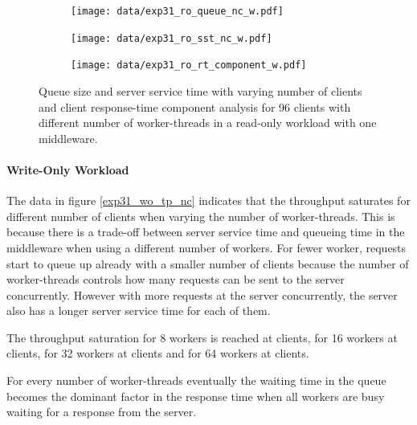 \documentclass[11pt,a4paper]{article}
\begin{document}


\begin{figure}
	\begin{subfigure}[b]{.33\linewidth}
		\centering
		\texttt{[image: data/exp31\_ro\_queue\_nc\_w.pdf]}
		\caption{}\label{exp31_ro_q}
	\end{subfigure}\hfill
	\begin{subfigure}[b]{.33\linewidth}
		\centering
		\texttt{[image: data/exp31\_ro\_sst\_nc\_w.pdf]}
		\caption{}\label{exp31_ro_sst}
	\end{subfigure}\hfill
	\begin{subfigure}[b]{.33\linewidth}
		\centering
		\texttt{[image: data/exp31\_ro\_rt\_component\_w.pdf]}
		\caption{}\label{exp31_ro_rtcomp}
	\end{subfigure}
	\caption{Queue size and server service time with varying number of clients and client response-time component analysis for 96 clients with different number of worker-threads in a read-only workload with one middleware.}
\end{figure}


\paragraph{Write-Only Workload}


The data in figure \ref{exp31_wo_tp_nc} indicates that the throughput saturates for different number of clients when varying the number of worker-threads. This is because there is a trade-off between server service time and queueing time in the middleware when using a different number of workers. For fewer worker, requests start to queue up already with a smaller number of clients because the number of worker-threads controls how many requests can be sent to the server concurrently. However with more requests at the server concurrently, the server also has a longer server service time for each of them.

The throughput saturation for 8 workers is reached at  clients, for 16 workers at  clients, for 32 workers at  clients and for 64 workers at  clients.

For every number of worker-threads eventually the waiting time in the queue becomes the dominant factor in the response time when all workers are busy waiting for a response from the server.
\end{document}
